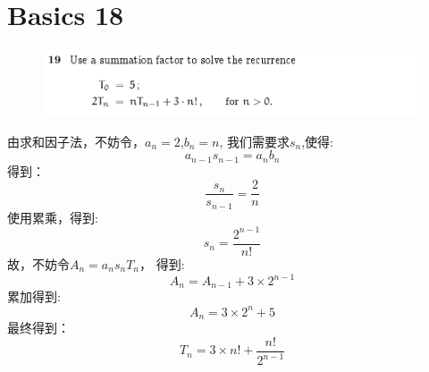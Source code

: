 \documentclass[]{article}
\begin{document}
\section*{Basics 18}
\begin{figure}[H]
    \includegraphics[scale = 1]{Q4.png}
\end{figure}
由求和因子法，不妨令，$a_{n} = 2$,$b_{n} = n$,
我们需要求$s_{n}$,使得:
\begin{equation}
    a_{n-1}s_{n-1} = a_{n}b_{n} 
\end{equation}
得到：
\begin{equation}
    \frac{s_{n}}{s_{n-1}} = \frac{2}{n}
\end{equation}
使用累乘，得到:
\begin{equation}
    s_{n} = \frac{2^{n-1}}{n!}
\end{equation}
故，不妨令$A_{n} = a_{n}s_{n}T_{n}$，
得到:
\begin{equation}
    A_{n} = A_{n-1} + 3\times 2^{n-1}
\end{equation}
累加得到:
\begin{equation}
    A_{n} = 3\times 2^n +5
\end{equation}
最终得到：
\begin{equation}
    T_{n} = 3 \times n! + \frac{n!}{2^{n-1}}
\end{equation}
\end{document}
